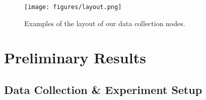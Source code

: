 \documentclass[sigconf, anonymous, 9pt, nonacm]{acmart}
\begin{document}

















\begin{figure}[htbp]
\centering
\texttt{[image: figures/layout.png]}
\caption{Examples of the layout of our data collection nodes.}
\label{fig:layout}
\vspace{-2em}
\end{figure}


\section{Preliminary Results}
\label{sec:results}

\subsection{Data Collection \& Experiment Setup}
\end{document}
